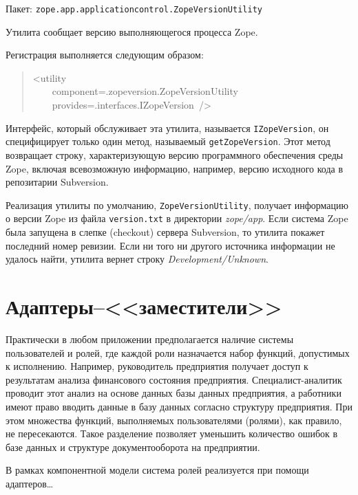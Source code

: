 \documentclass[a4paper,openany,twoside,final]{book}
\providecommand*{\DUroletitlereference}[1]{\textsl{#1}}
\begin{document}
Пакет: \texttt{zope.app.applicationcontrol.ZopeVersionUtility}

Утилита сообщает версию выполняющегося процесса Zope.

Регистрация выполняется следующим образом:

\begin{quote}{\ttfamily \raggedright \noindent
<utility\\
~~~~component=\textquotedbl{}.zopeversion.ZopeVersionUtility\textquotedbl{}\\
~~~~provides=\textquotedbl{}.interfaces.IZopeVersion\textquotedbl{}~/>
}
\end{quote}

Интерфейс, который обслуживает эта утилита, называется
\texttt{IZopeVersion}, он специфицирует только один метод, называемый
\texttt{getZopeVersion}.  Этот метод возвращает строку, характеризующую
версию программного обеспечения среды Zope, включая всевозможную
информацию, например, версию исходного кода в репозитарии Subversion.

Реализация утилиты по умолчанию, \texttt{ZopeVersionUtility}, получает
информацию о версии Zope из файла \texttt{version.txt} в директории
\DUroletitlereference{zope/app}.  Если система Zope была запущена в слепке (checkout)
сервера Subversion, то утилита покажет последний номер ревизии.  Если
ни того ни другого источника информации не удалось найти, утилита
вернет строку \DUroletitlereference{Development/Unknown}.

\section{Адаптеры--<<заместители>>}
\label{sec:proxyadapters}

Практически в любом приложении предполагается наличие системы пользователей и ролей, где каждой роли назначается набор функций, допустимых к исполнению.  Например, руководитель предприятия получает доступ к результатам анализа финансового состояния предприятия.  Специалист-аналитик проводит этот анализ на основе данных базы данных предприятия, а работники имеют право вводить данные в базу данных согласно структуру предприятия.  При этом множества функций, выполняемых пользователями (ролями), как правило, не пересекаются.  Такое разделение позволяет уменьшить количество ошибок в базе данных и структуре документооборота на предприятии.

В рамках компонентной модели система ролей реализуется при помощи адаптеров\ldots{}
\end{document}
